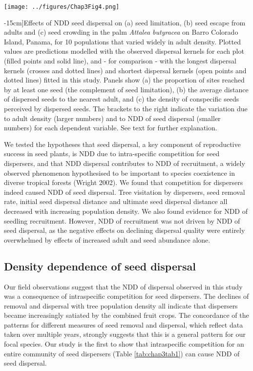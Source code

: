 \documentclass[b5paper,justified]{tufte-book} %
\begin{document}
\begin{fullwidth}
\begin{figure*}
\hspace*{1cm}\texttt{[image: ../figures/Chap3Fig4.png]}
\caption[Effects of NDD seed dispersal][-15cm]{Effects of NDD seed dispersal on (a) seed limitation, (b) seed escape from adults and (c) seed crowding in the palm \textit{Attalea butyracea} on Barro Colorado Island, Panama, for 10 populations that varied widely in adult density. Plotted values are predictions modelled with the observed dispersal kernels for each plot (filled points and solid line), and - for comparison - with the longest dispersal kernels (crosses and dotted lines) and shortest dispersal kernels (open points and dotted lines) fitted in this study. Panels show (a) the proportion of sites reached by at least one seed (the complement of seed limitation), (b) the average distance of dispersed seeds to the nearest adult, and (c) the density of conspecific seeds perceived by dispersed seeds. The brackets to the right indicate the variation due to adult density (larger numbers) and to NDD of seed dispersal (smaller numbers) for each dependent variable. See text for further explanation.
 }
\label{fig:chap3fig4}
\end{figure*}

We tested the hypotheses that seed dispersal, a key component of reproductive success in seed plants, is NDD due to intra-specific competition for seed dispersers, and that NDD dispersal contributes to NDD of recruitment, a widely observed phenomenon hypothesised to be important to species coexistence in diverse tropical forests (Wright 2002). We found that competition for dispersers indeed caused NDD of seed dispersal. Tree visitation by dispersers, seed removal rate, initial seed dispersal distance and ultimate seed dispersal distance all decreased with increasing population density. We also found evidence for NDD of seedling recruitment. However, NDD of recruitment was not driven by NDD of seed dispersal, as the negative effects on declining dispersal quality were entirely overwhelmed by effects of increased adult and seed abundance alone. 

\subsection{Density dependence of seed dispersal }
Our field observations suggest that the NDD of dispersal observed in this study was a consequence of intraspecific competition for seed dispersers. The declines of removal and dispersal with tree population density all indicate that dispersers became increasingly satiated by the combined fruit crops. The concordance of the patterns for different measures of seed removal and dispersal, which reflect data taken over multiple years, strongly suggests that this is a general pattern for our focal species. Our study is the first to show that intraspecific competition for an entire community of seed dispersers (Table \ref{tab:chap3tab1}) can cause NDD of seed dispersal. 


\end{fullwidth}
\end{document}
